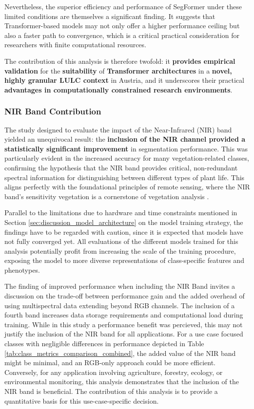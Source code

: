 \documentclass{report}
\begin{document}
\par 
Nevertheless, the superior efficiency and performance of SegFormer under these limited conditions are themselves a significant finding. It suggests that Transformer-based models may not only offer a higher performance ceiling but also a faster path to convergence, which is a critical practical consideration for researchers with finite computational resources. 
\par The contribution of this analysis is therefore twofold: it \textbf{provides empirical validation} for the \textbf{suitability} of \textbf{Transformer architectures} in a \textbf{novel, highly granular LULC context} in Austria, and it underscores their practical \textbf{advantages in computationally constrained research environments}.
\subsubsection{NIR Band Contribution}
The study designed to evaluate the impact of the Near-Infrared (NIR) band yielded an unequivocal result: the \textbf{inclusion of the NIR channel provided a statistically significant improvement} in segmentation performance. This was particularly evident in the increased accuracy for many vegetation-related classes, confirming the hypothesis that the NIR band provides critical, non-redundant spectral information for distinguishing between different types of plant life. This aligns perfectly with the foundational principles of remote sensing, where the NIR band's sensitivity vegetation is a cornerstone of vegetation analysis \parencite[p.~183]{LuoEtAlSemanticsegmentationagriculturalimagessurvey2024}. \par
Parallel to the limitations due to hardware and time constraints mentioned in Section \ref{sec:discussion_model_architecture} on the model training strategy, the findings have to be regarded with caution, since it is expected that models have not fully converged yet. All evaluations of the different models trained for this analysis potentially profit from increasing the scale of the training procedure, exposing the model to more diverse representations of class-specific features and phenotypes. \par
The finding of improved performance when including the NIR Band invites a discussion on the trade-off between performance gain and the added overhead of using multispectral data extending beyond RGB channels. The inclusion of a fourth band increases data storage requirements and computational load during training. While in this study a performance benefit was percieved, this may not justify the inclusion of the NIR band for all applications. For a use case focused classes with negligible differences in performance depicted in Table \ref{tab:class_metrics_comparison_combined}, the added value of the NIR band might be minimal, and an RGB-only approach could be more efficient. Conversely, for any application involving agriculture, forestry, ecology, or environmental monitoring, this analysis demonstrates that the inclusion of the NIR band is beneficial. The contribution of this analysis is to provide a quantitative basis for this use-case-specific decision.
\end{document}
